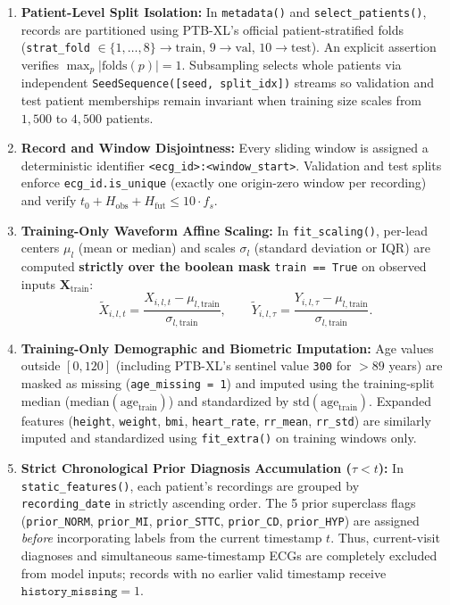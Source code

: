 \documentclass[11pt,a4paper]{article}
\begin{document}
\begin{enumerate}
    \item \textbf{Patient-Level Split Isolation:} In \texttt{metadata()} and \texttt{select\_patients()}, records are partitioned using PTB-XL's official patient-stratified folds (\texttt{strat\_fold} $\in \{1,\dots,8\} \to \text{train}$, $9 \to \text{val}$, $10 \to \text{test}$). An explicit assertion verifies $\max_{p} |\text{folds}(p)| = 1$. Subsampling selects whole patients via independent \texttt{SeedSequence([seed, split\_idx])} streams so validation and test patient memberships remain invariant when training size scales from $1{,}500$ to $4{,}500$ patients.
    \item \textbf{Record and Window Disjointness:} Every sliding window is assigned a deterministic identifier \texttt{<ecg\_id>:<window\_start>}. Validation and test splits enforce \texttt{ecg\_id.is\_unique} (exactly one origin-zero window per recording) and verify $t_0 + H_{\text{obs}} + H_{\text{fut}} \le 10 \cdot f_s$.
    \item \textbf{Training-Only Waveform Affine Scaling:} In \texttt{fit\_scaling()}, per-lead centers $\mu_l$ (mean or median) and scales $\sigma_l$ (standard deviation or IQR) are computed \textbf{strictly over the boolean mask} \texttt{train == True} on observed inputs $\mathbf{X}_{\text{train}}$:
    \begin{equation}
        \tilde{X}_{i,l,t} = \frac{X_{i,l,t} - \mu_{l,\text{train}}}{\sigma_{l,\text{train}}}, \qquad \tilde{Y}_{i,l,\tau} = \frac{Y_{i,l,\tau} - \mu_{l,\text{train}}}{\sigma_{l,\text{train}}}.
    \end{equation}
    \item \textbf{Training-Only Demographic and Biometric Imputation:} Age values outside $[0, 120]$ (including PTB-XL's sentinel value \texttt{300} for $>89$ years) are masked as missing (\texttt{age\_missing = 1}) and imputed using the training-split median ($\text{median}(\text{age}_{\text{train}})$) and standardized by $\text{std}(\text{age}_{\text{train}})$. Expanded features (\texttt{height}, \texttt{weight}, \texttt{bmi}, \texttt{heart\_rate}, \texttt{rr\_mean}, \texttt{rr\_std}) are similarly imputed and standardized using \texttt{fit\_extra()} on training windows only.
    \item \textbf{Strict Chronological Prior Diagnosis Accumulation ($\tau < t$):} In \texttt{static\_features()}, each patient's recordings are grouped by \texttt{recording\_date} in strictly ascending order. The 5 prior superclass flags (\texttt{prior\_NORM}, \texttt{prior\_MI}, \texttt{prior\_STTC}, \texttt{prior\_CD}, \texttt{prior\_HYP}) are assigned \emph{before} incorporating labels from the current timestamp $t$. Thus, current-visit diagnoses and simultaneous same-timestamp ECGs are completely excluded from model inputs; records with no earlier valid timestamp receive $\texttt{history\_missing} = 1$.

\end{enumerate}
\end{document}
